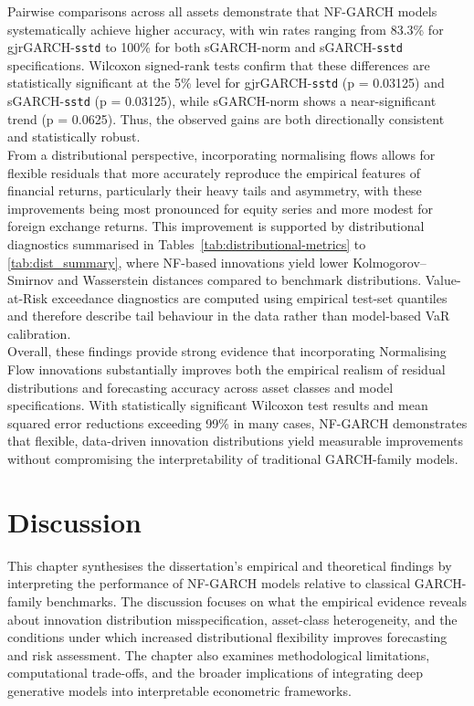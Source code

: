 \documentclass[oneside,12pt]{CUEDthesisPSnPDF}
\begin{document}
\medskip
\noindent
Pairwise comparisons across all assets demonstrate that NF-GARCH models systematically achieve higher accuracy, with win rates ranging from 83.3\% for gjrGARCH-\texttt{sstd} to 100\% for both sGARCH-norm and sGARCH-\texttt{sstd} specifications. Wilcoxon signed-rank tests confirm that these differences are statistically significant at the 5\% level for gjrGARCH-\texttt{sstd} (p = 0.03125) and sGARCH-\texttt{sstd} (p = 0.03125), while sGARCH-norm shows a near-significant trend (p = 0.0625). Thus, the observed gains are both directionally consistent and statistically robust.\\

\medskip
\noindent
From a distributional perspective, incorporating normalising flows allows for flexible residuals that more accurately reproduce the empirical features of financial returns, particularly their heavy tails and asymmetry, with these improvements being most pronounced for equity series and more modest for foreign exchange returns. This improvement is supported by distributional diagnostics summarised in Tables~\ref{tab:distributional-metrics} to \ref{tab:dist_summary}, where NF-based innovations yield lower Kolmogorov–Smirnov and Wasserstein distances compared to benchmark distributions. Value-at-Risk exceedance diagnostics are computed using empirical test-set quantiles and therefore describe tail behaviour in the data rather than model-based VaR calibration.\\

\medskip
\noindent
Overall, these findings provide strong evidence that incorporating Normalising Flow innovations substantially improves both the empirical realism of residual distributions and forecasting accuracy across asset classes and model specifications. With statistically significant Wilcoxon test results and mean squared error reductions exceeding 99\% in many cases, NF-GARCH demonstrates that flexible, data-driven innovation distributions yield measurable improvements without compromising the interpretability of traditional GARCH-family models.\\



\chapter{Discussion}
\label{ch:discussion}

\noindent
\noindent
This chapter synthesises the dissertation’s empirical and theoretical findings by interpreting the performance of NF-GARCH models relative to classical GARCH-family benchmarks. The discussion focuses on what the empirical evidence reveals about innovation distribution misspecification, asset-class heterogeneity, and the conditions under which increased distributional flexibility improves forecasting and risk assessment. The chapter also examines methodological limitations, computational trade-offs, and the broader implications of integrating deep generative models into interpretable econometric frameworks.\\
\end{document}
